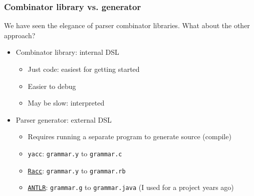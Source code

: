 \begin{frame}
  \frametitle{Combinator library vs. generator}

  We have seen the elegance of parser combinator libraries. What about the other approach?

  \begin{itemize}
    \item<1-> Combinator library: internal DSL
      \begin{itemize}
        \item Just code: easiest for getting started
        \item Easier to debug
        \item May be slow: interpreted
      \end{itemize}
    \item<2-> Parser generator: external DSL
      \begin{itemize}
        \item Requires running a separate program to generate source (compile)
        \item \texttt{yacc}: \texttt{grammar.y} to \texttt{grammar.c}
        \item \href{http://i.loveruby.net/en/projects/racc/}{\texttt{Racc}}: \texttt{grammar.y} to \texttt{grammar.rb}
        \item \href{http://www.antlr.org/}{\texttt{ANTLR}}: \texttt{grammar.g} to \texttt{grammar.java} (I used for a project years ago)
      \end{itemize}
  \end{itemize}
\end{frame}
